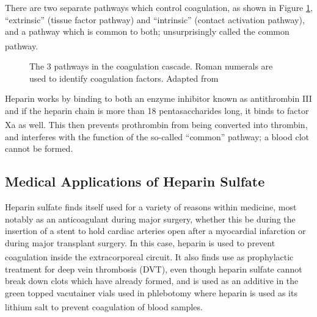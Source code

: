 There are two separate pathways which control coagulation, as shown in Figure \ref{coagulation_cascade}, “extrinsic” (tissue factor pathway) and “intrinsic” (contact activation pathway), and a pathway which is common to both; unsurprisingly called the common pathway.\textsuperscript{\cite{Sabir2014OralFibrillation}}
\begin{figure} [ht!]
\caption{The 3 pathways in the coagulation cascade. Roman numerals are used to identify coagulation factors.
Adapted from \cite{Palta2014OverviewSystem.,Peters2013UtilizationTherapeutics,Hirsh2001MechanismHeparin}}
\label{coagulation_cascade}
\end{figure}
\newline
Heparin works by binding to both an enzyme inhibitor known as antithrombin III and if the heparin chain is more than 18 pentasaccharides long, it binds to factor Xa as well.\textsuperscript{\cite{Hirsh2001MechanismHeparin}} This then prevents prothrombin from being converted into thrombin, and interferes with the function of the so-called “common” pathway; a blood clot cannot be formed. 

\subsection{Medical Applications of Heparin Sulfate}
Heparin sulfate finds itself used for a variety of reasons within medicine, most notably as an anticoagulant during major surgery, whether this be during the insertion of a stent to hold cardiac arteries open after a myocardial infarction or during major transplant surgery. In this case, heparin is used to prevent coagulation inside the extracorporeal circuit.\textsuperscript{\cite{BritishMedicalAssociation.2017BNF2017.}} 
\newline
It also finds use as prophylactic treatment for deep vein thrombosis (DVT), even though heparin sulfate cannot break down clots which have already formed, and is used as an additive in the green topped vacutainer vials used in phlebotomy where heparin is used as its lithium salt to prevent coagulation of blood samples.\textsuperscript{\cite{BritishMedicalAssociation.2017BNF2017.}}

